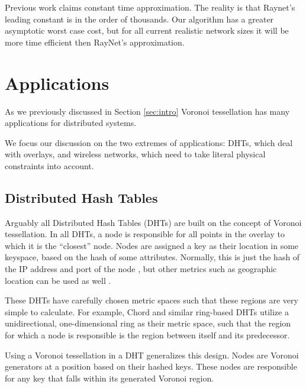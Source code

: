 \documentclass[11pt, conference, letterpaper]{IEEEtran}
\begin{document}
Previous work \cite{raynet} claims constant time approximation. 
The reality is that Raynet's leading constant is in the order of thousands. %
Our algorithm has a greater asymptotic worst case cost, but for all current realistic network sizes it will be more time efficient then RayNet's approximation.





\section{Applications}
\label{sec:applications}

As we previously discussed in Section \ref{sec:intro} Voronoi tessellation has many applications for distributed systems.

We focus our discussion on the two extremes of applications: DHTs, which deal with overlays, and wireless networks, which need to take literal physical constraints into account.




\subsection{Distributed Hash Tables}
Arguably all Distributed Hash Tables (DHTs) are built on the concept of Voronoi tessellation.
In all DHTs, a node is responsible for all points in the overlay to which it is the ``closest'' node.
Nodes are assigned a key as their location in some keyspace, based on the hash of some attributes.
Normally, this is just the hash of the IP address and port of the node  \cite{chord} \cite{kademlia} \cite{can} \cite{pastry}, but other metrics such as geographic location can be used as well \cite{ratnasamy2002ght}.

These DHTs have carefully chosen metric spaces such that these regions are very simple to calculate.
For example, Chord and similar ring-based DHTs utilize a unidirectional, one-dimensional ring as their metric space, such that the region for which a node is responsible is the region between itself and its predecessor.

Using a Voronoi tessellation in a DHT generalizes this design. 
Nodes are Voronoi generators at a position based on their hashed keys.
These nodes are responsible for any key that falls within its generated Voronoi region.
\end{document}
